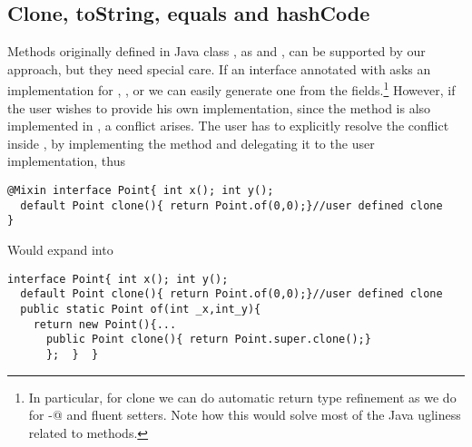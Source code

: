 \subsection{Clone, toString, equals and hashCode}

Methods originally defined in Java class \Q@Object@, as \Q@clone@ and
\Q@toString@, can be supported by our approach, but they need special
care. If an interface annotated with \mixin asks an implementation for
\Q@clone@, \Q@toString@, \Q@equals@ or \Q@hashCode@ we can easily
generate one from the fields.\footnote{In particular, for clone we can
  do automatic return type refinement as we do for \Q@with-@ and
  fluent setters. Note how this would solve most of the Java ugliness
  related to \Q@clone@ methods.}
However, if the user wishes to provide his own implementation, since the method is
also implemented in \Q@Object@, a conflict arises. The user has to
explicitly resolve the conflict inside \Q@of@, by implementing the method and
delegating it to the user implementation, thus
\begin{lstlisting}
@Mixin interface Point{ int x(); int y();
  default Point clone(){ return Point.of(0,0);}//user defined clone
}
\end{lstlisting} 
Would expand into 

\begin{lstlisting}
interface Point{ int x(); int y();
  default Point clone(){ return Point.of(0,0);}//user defined clone
  public static Point of(int _x,int_y){
    return new Point(){...
      public Point clone(){ return Point.super.clone();}
      };  }  }
\end{lstlisting} 
